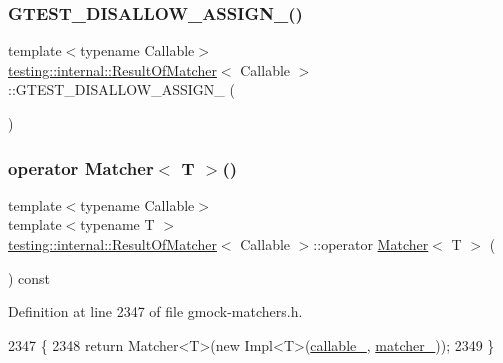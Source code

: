 \subsubsection{\texorpdfstring{G\+T\+E\+S\+T\+\_\+\+D\+I\+S\+A\+L\+L\+O\+W\+\_\+\+A\+S\+S\+I\+G\+N\+\_\+()}{GTEST\_DISALLOW\_ASSIGN\_()}}
{\footnotesize\ttfamily template$<$typename Callable$>$ \\
\hyperlink{classtesting_1_1internal_1_1ResultOfMatcher}{testing\+::internal\+::\+Result\+Of\+Matcher}$<$ Callable $>$\+::G\+T\+E\+S\+T\+\_\+\+D\+I\+S\+A\+L\+L\+O\+W\+\_\+\+A\+S\+S\+I\+G\+N\+\_\+ (\begin{DoxyParamCaption}\item[{\hyperlink{classtesting_1_1internal_1_1ResultOfMatcher}{Result\+Of\+Matcher}$<$ Callable $>$}]{ }\end{DoxyParamCaption})\hspace{0.3cm}{\ttfamily [private]}}

\mbox{\label{classtesting_1_1internal_1_1ResultOfMatcher_ab537f63126b81ea991ff369becf7ad7e}} 
\subsubsection{\texorpdfstring{operator Matcher$<$ T $>$()}{operator Matcher< T >()}}
{\footnotesize\ttfamily template$<$typename Callable$>$ \\
template$<$typename T $>$ \\
\hyperlink{classtesting_1_1internal_1_1ResultOfMatcher}{testing\+::internal\+::\+Result\+Of\+Matcher}$<$ Callable $>$\+::operator \hyperlink{classtesting_1_1Matcher}{Matcher}$<$ T $>$ (\begin{DoxyParamCaption}{ }\end{DoxyParamCaption}) const\hspace{0.3cm}{\ttfamily [inline]}}



Definition at line 2347 of file gmock-\/matchers.\+h.


\begin{DoxyCode}
2347                               \{
2348     \textcolor{keywordflow}{return} Matcher<T>(\textcolor{keyword}{new} Impl<T>(\hyperlink{classtesting_1_1internal_1_1ResultOfMatcher_a0da13870ff65546571ed39ec798242aa}{callable\_}, \hyperlink{classtesting_1_1internal_1_1ResultOfMatcher_ad74ae1b72a5f2045ea1e557e7c643887}{matcher\_}));
2349   \}
\end{DoxyCode}


